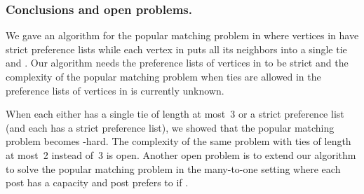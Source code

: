\documentclass[11pt]{llncs}
\begin{document}
\subsubsection{Conclusions and open problems.} We gave an  algorithm for the popular 
matching problem in  where vertices in  have strict preference lists while 
each vertex in  puts all its neighbors into a single tie and .
Our algorithm needs the preference lists of vertices in  to be strict and 
the complexity of the popular matching problem when ties are allowed in the preference lists of 
vertices in  is currently unknown.  

When each  either has a single tie of length at most~3 or a strict preference list (and each  has a strict preference list), we showed that the popular matching problem becomes -hard. The complexity of the same problem with ties of length at most~2 instead of~3 is open. 
Another open problem is to extend our algorithm to solve the popular matching problem in the many-to-one 
setting where each post  has a capacity 
and post  prefers  to  if . 
\end{document}
